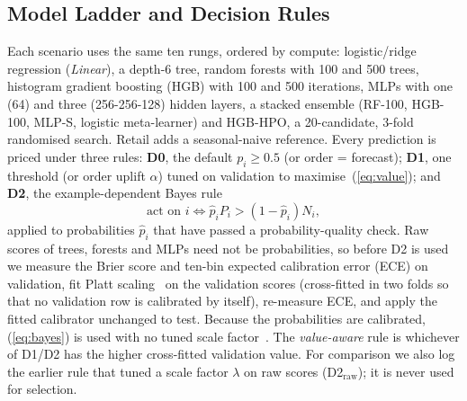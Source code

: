 \documentclass[conference]{IEEEtran}
\begin{document}
\subsection{Model Ladder and Decision Rules}
Each scenario uses the same ten rungs, ordered by compute: logistic/ridge regression (\emph{Linear}), a depth-6 tree,
random forests with 100 and 500 trees, histogram gradient boosting (HGB) with 100 and 500 iterations, MLPs with one
(64) and three (256-256-128) hidden layers, a stacked ensemble (RF-100, HGB-100, MLP-S, logistic meta-learner) and
HGB-HPO, a 20-candidate, 3-fold randomised search. Retail adds a seasonal-naive reference. Every prediction is priced under
three rules: \textbf{D0}, the default $p_i \geq 0.5$ (or order = forecast); \textbf{D1}, one threshold (or order uplift
$\alpha$) tuned on validation to maximise~(\ref{eq:value}); and \textbf{D2}, the example-dependent Bayes rule
\begin{equation}
\text{act on } i \iff \hat p_i P_i > (1-\hat p_i) N_i,
\label{eq:bayes}
\end{equation}
applied to probabilities $\hat p_i$ that have passed a probability-quality check. Raw scores of trees, forests and MLPs
need not be probabilities, so before D2 is used we measure the Brier score and ten-bin expected calibration error (ECE)
on validation, fit Platt scaling~\cite{platt1999} on the validation scores (cross-fitted in two folds so that no
validation row is calibrated by itself), re-measure ECE, and apply the fitted calibrator unchanged to test. Because the
probabilities are calibrated, (\ref{eq:bayes}) is used with no tuned scale factor~\cite{elkan2001,bahnsen2015}. The
\emph{value-aware} rule is whichever of D1/D2 has the higher cross-fitted validation value. For comparison we also log
the earlier rule that tuned a scale factor $\lambda$ on raw scores (D2$_\text{raw}$); it is never used for selection.
\end{document}

